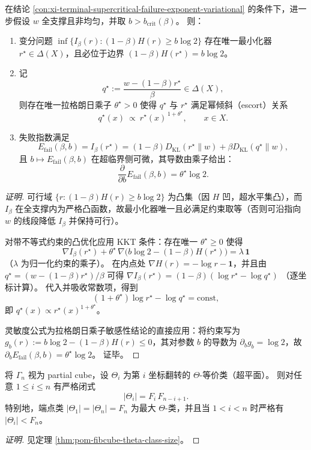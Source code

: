 \begin{conclusion}\label{con:xi-terminal-failure-exponent-escort-kkt}
在结论 \ref{con:xi-terminal-supercritical-failure-exponent-variational} 的条件下，进一步假设 \(w\) 全支撑且非均匀，并取 \(b>b_{\mathrm{crit}}(\beta)\)。
则：
\begin{enumerate}
  \item 变分问题
  \(
  \inf\{I_\beta(r):(1-\beta)H(r)\ge b\log 2\}
  \)
  存在唯一最小化器 \(r^\star\in\Delta(X)\)，且必位于边界 \((1-\beta)H(r^\star)=b\log 2\)。
  \item 记
  \[
  q^\star:=\frac{w-(1-\beta)r^\star}{\beta}\in\Delta(X),
  \]
  则存在唯一拉格朗日乘子 \(\theta^\star>0\) 使得 \(q^\star\) 与 \(r^\star\) 满足幂倾斜（escort）关系
  \[
  \boxed{\;
  q^\star(x)\ \propto\ r^\star(x)^{\,1+\theta^\star},\qquad x\in X.\;}
  \]
  \item 失败指数满足
  \[
  E_{\mathrm{fail}}(\beta,b)=I_\beta(r^\star)
  =(1-\beta)D_{\mathrm{KL}}(r^\star\|w)+\beta D_{\mathrm{KL}}(q^\star\|w),
  \]
  且 \(b\mapsto E_{\mathrm{fail}}(\beta,b)\) 在超临界侧可微，其导数由乘子给出：
  \[
  \boxed{\;\frac{\partial}{\partial b}E_{\mathrm{fail}}(\beta,b)=\theta^\star\log 2.\;}
  \]
\end{enumerate}
\end{conclusion}
\begin{proof}[证明]
可行域 \(\{r:(1-\beta)H(r)\ge b\log 2\}\) 为凸集（因 \(H\) 凹，超水平集凸），而 \(I_\beta\) 在全支撑内为严格凸函数，故最小化器唯一且必满足约束取等（否则可沿指向 \(w\) 的线段降低 \(I_\beta\) 并保持可行）。
\par
对带不等式约束的凸优化应用 KKT 条件：存在唯一 \(\theta^\star\ge 0\) 使得
\[
\nabla I_\beta(r^\star)+\theta^\star\,\nabla\bigl(b\log 2-(1-\beta)H(r^\star)\bigr)=\lambda\,\mathbf 1
\]
（\(\lambda\) 为归一化约束的乘子）。
在内点处 \(\nabla H(r)=-\log r-\mathbf 1\)，并且由 \(q^\star=(w-(1-\beta)r^\star)/\beta\) 可得
\(
\nabla I_\beta(r^\star)=(1-\beta)(\log r^\star-\log q^\star)
\)
（逐坐标计算）。
代入并吸收常数项，得到
\[
(\,1+\theta^\star)\log r^\star-\log q^\star=\mathrm{const},
\]
即 \(q^\star(x)\propto r^\star(x)^{1+\theta^\star}\)。
\par
灵敏度公式为拉格朗日乘子敏感性结论的直接应用：将约束写为 \(g_b(r):=b\log 2-(1-\beta)H(r)\le 0\)，其对参数 \(b\) 的导数为 \(\partial_b g_b=\log 2\)，故 \(\partial_b E_{\mathrm{fail}}(\beta,b)=\theta^\star\log 2\)。
证毕。
\end{proof}

\begin{conclusion}\label{con:xi-terminal-fibcube-hyperplane-theta-stats}
将 \(\Gamma_n\) 视为 partial cube，设 \(\Theta_i\) 为第 \(i\) 坐标翻转的 \(\Theta\)-等价类（超平面）。
则对任意 \(1\le i\le n\) 有严格闭式
\[
|\Theta_i|=F_i\,F_{n-i+1}.
\]
特别地，端点类 \(|\Theta_1|=|\Theta_n|=F_n\) 为最大 \(\Theta\)-类，并且当 \(1<i<n\) 时严格有 \(|\Theta_i|<F_n\)。
\end{conclusion}
\begin{proof}[证明]
见定理 \ref{thm:pom-fibcube-theta-class-size}。
\end{proof}

